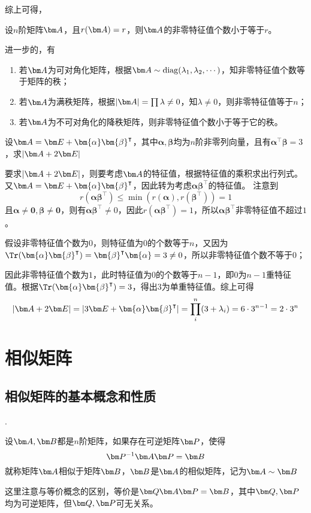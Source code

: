 综上可得，
\begin{theorem}
    设$n$阶矩阵$\mat{A}$，且$r(\mat{A})=r$，则$\mat{A}$的非零特征值个数小于等于$r$。
\end{theorem}
进一步的，有
\begin{enumerate}[(1)]
    \item 若$\mat{A}$为可对角化矩阵，根据$\mat{A}\sim \operatorname{diag}(\lambda_1,\lambda_2,\cdots)$，知非零特征值个数等于矩阵的秩；
    \item 若$\mat{A}$为满秩矩阵，根据$|\mat{A}|=\prod \lambda \neq 0$，知$\lambda\neq 0$，则非零特征值等于$n$；
    \item 若$\mat{A}$为不可对角化的降秩矩阵，则非零特征值个数小于等于它的秩。
\end{enumerate}

\begin{example}
    设$\mat{A}=\mat{E}+\bm{\alpha}\bm{\beta}^\intercal$，其中$\bm{\alpha},\bm{\beta}$均为$n$阶非零列向量，且有$\bm{\alpha}^\intercal\bm{\beta}=3$，求$|\mat{A}+2\mat{E}|$
\end{example}
\begin{solution}
    要求$|\mat{A}+2\mat{E}|$，则要考虑$\mat{A}$的特征值，根据特征值的乘积求出行列式。又$\mat{A}=\mat{E}+\bm{\alpha}\bm{\beta}^\intercal$，因此转为考虑$\bm{\alpha}\bm{\beta}^\intercal$的特征值。
    注意到
    \[ r(\bm{\alpha}\bm{\beta}^\intercal) \leq \min(r(\bm{\alpha}),r(\bm{\beta}^\intercal)) = 1 \]
    且$\bm{\alpha}\neq \bm{0},\bm{\beta}\neq \bm{0}$，则有$\bm{\alpha}\bm{\beta}^\intercal\neq 0$，因此$r(\bm{\alpha}\bm{\beta}^\intercal)=1$，所以$\bm{\alpha}\bm{\beta}^\intercal$非零特征值不超过$1$。

    假设非零特征值个数为$0$，则特征值为$0$的个数等于$n$，又因为$\Tr(\bm{\alpha}\bm{\beta}^\intercal)=\bm{\beta}^\intercal\bm{\alpha} = 3\neq 0$，所以非零特征值个数不等于$0$；

    因此非零特征值个数为$1$，此时特征值为$0$的个数等于$n-1$，即$0$为$n-1$重特征值。根据$\Tr(\bm{\alpha}\bm{\beta}^\intercal)=3$，得出$3$为单重特征值。综上可得
    \[ |\mat{A}+2\mat{E}| = |3\mat{E} + \bm{\alpha}\bm{\beta}^\intercal| = \prod_i^n (3+\lambda_i) = 6\cdot 3^{n-1} = 2\cdot 3^n \]

\end{solution}

\section{相似矩阵}
\subsection{相似矩阵的基本概念和性质}
.
\begin{definition}
    设$\mat{A},\mat{B}$都是$n$阶矩阵，如果存在可逆矩阵$\mat{P}$，使得
    \[ \mat{P}^{-1}\mat{A}\mat{P} = \mat{B} \]
    就称矩阵$\mat{A}$相似于矩阵$\mat{B}$，$\mat{B}$是$\mat{A}$的相似矩阵，记为$\mat{A}\sim \mat{B}$
\end{definition}
这里注意与等价概念的区别，等价是$\mat{Q\mat{A}\mat{P}}=\mat{B}$，其中$\mat{Q},\mat{P}$均为可逆矩阵，但$\mat{Q},\mat{P}$可无关系。

